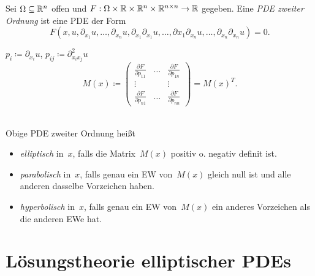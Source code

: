 \documentclass{cheat-sheet}
\begin{document}
\begin{defn}
  Sei $\Omega \subseteq \mathbb{R}^n$ offen und $F : \Omega \times \mathbb{R} \times \mathbb{R}^n \times \mathbb{R}^{n \times n} \to \mathbb{R}$ gegeben.
  Eine \emph{PDE zweiter Ordnung} ist eine PDE der Form
  \[ F(x, u, \partial_{x_1} u, \ldots, \partial_{x_n} u, \partial_{x_1} \partial_{x_1} u, \ldots, \partial{x_1} \partial_{x_n} u, \ldots, \partial_{x_n} \partial_{x_n} u) = 0. \]
\end{defn}

\begin{nota}
  $p_i \coloneqq \partial_{x_i} u$, $p_{ij} \coloneqq \partial^2_{x_i x_j} u$
  \[
    M(x) \coloneqq \begin{pmatrix}
      \tfrac{\partial F}{\partial p_{11}} & \hdots & \tfrac{\partial F}{\partial p_{1n}} \\
      \vdots && \vdots \\
      \tfrac{\partial F}{\partial p_{n1}} & \hdots & \tfrac{\partial F}{\partial p_{nn}}
    \end{pmatrix} = M(x)^{T}.
  \]
\end{nota}

\begin{defn}\mbox{}\\
  Obige PDE zweiter Ordnung heißt
  \begin{itemize}
    \item \emph{elliptisch} in~$x$, falls die Matrix~$M(x)$ positiv o. negativ definit ist.
    \item \emph{parabolisch} in~$x$, falls genau ein EW von~$M(x)$ gleich null ist und alle anderen dasselbe Vorzeichen haben.
    \item \emph{hyperbolisch} in~$x$, falls genau ein EW von~$M(x)$ ein anderes Vorzeichen als die anderen EWe hat.
  \end{itemize}
\end{defn}



\section{Lösungstheorie elliptischer PDEs}
\end{document}
